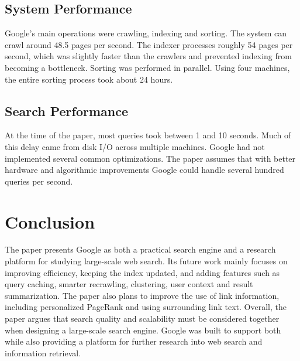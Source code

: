 \documentclass[10pt,a4paper]{article}
\begin{document}
\subsection{System Performance}

Google's main operations were crawling, indexing and sorting. The system can crawl around 48.5 pages per second. The indexer processes roughly 54 pages per second, which was slightly faster than the crawlers and prevented indexing from becoming a bottleneck. Sorting was performed in parallel. Using four machines, the entire sorting process took about 24 hours.

\subsection{Search Performance}

At the time of the paper, most queries took between 1 and 10 seconds. Much of this delay came from disk I/O across multiple machines. Google had not implemented several common optimizations. The paper assumes that with better hardware and algorithmic improvements Google could handle several hundred queries per second.

\section{Conclusion}

The paper presents Google as both a practical search engine and a research platform for studying large-scale web search. Its future work mainly focuses on improving efficiency, keeping the index updated, and adding features such as query caching, smarter recrawling, clustering, user context and result summarization. The paper also plans to improve the use of link information, including personalized PageRank and using surrounding link text. Overall, the paper argues that search quality and scalability must be considered together when designing a large-scale search engine. Google was built to support both while also providing a platform for further research into web search and information retrieval.
\end{document}
